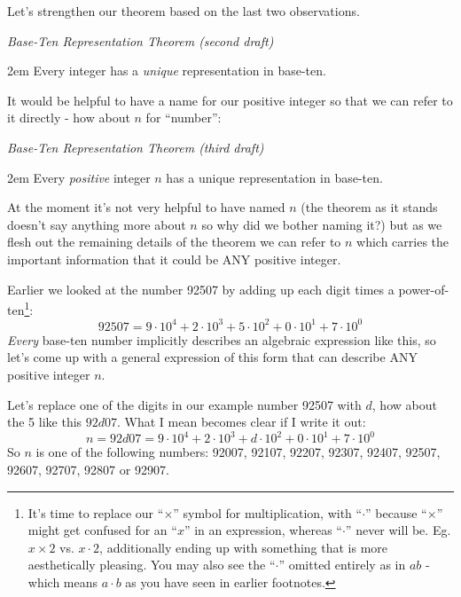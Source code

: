 \documentclass{article}
\newenvironment{jprIn}{\begin{adjustwidth}{2em}{}}{\end{adjustwidth}}
\begin{document}
Let's strengthen our theorem based on the last two observations.

\emph{Base-Ten Representation Theorem (second draft)}
\begin{jprIn}
Every integer has a \emph{unique} representation in base-ten.
\end{jprIn}

It would be helpful to have a name for our 
positive integer so that we can refer to it directly - how about $n$ for ``number'':

\emph{Base-Ten Representation Theorem (third draft)}
\begin{jprIn}
Every \emph{positive} integer $n$ has a unique representation in base-ten.
\end{jprIn}

At the moment it's not very helpful to have named $n$ (the theorem as it stands
doesn't say anything more about $n$ so why did we bother naming it?) but
as we flesh out the remaining details of the theorem
we can refer to $n$ which carries the important information that it could be ANY positive integer.

Earlier we looked at the number 92507 by adding up
each digit times a power-of-ten\footnote{It's time
to replace our ``$\times{}$'' symbol for multiplication, with ``$\cdot{}$''
because ``$\times{}$'' might get confused for an ``$x$'' in an expression,
whereas ``$\cdot{}$'' never will be. Eg. $x\times{}2$
vs. $x\cdot{}2$, additionally ending up with something that is more aesthetically pleasing.
You may also see the ``$\cdot$'' omitted entirely as
in $ab$ - which means $a\cdot{}b$ as you have seen in earlier footnotes.}:
\[92507=9{\cdot}10^4+2{\cdot}10^3+5{\cdot}10^2+0{\cdot}10^1+7{\cdot}10^0\]
\emph{Every} base-ten number implicitly describes an algebraic expression like this, so
let's come up
with a general expression of this form that can describe ANY positive integer $n$.

Let's replace one of the digits in our example number 92507 with $d$, how about the 5 like this $92d07$. What I
mean becomes clear if I write it out:
\[n=92d07=9{\cdot}10^4+2{\cdot}10^3+d{\cdot}10^2+0{\cdot}10^1+7{\cdot}10^0\]
So $n$ is one of the following numbers:
92007,
92107,
92207,
92307,
92407,
92507,
92607,
92707,
92807 or
92907.
\end{document}
